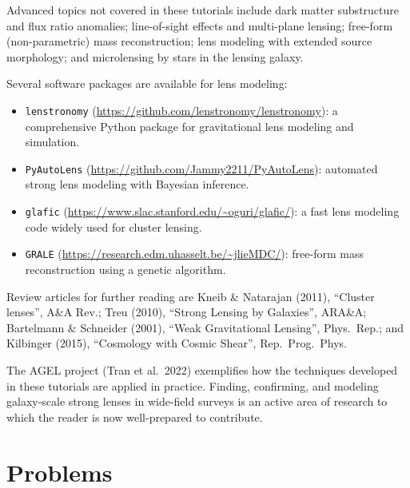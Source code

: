 Advanced topics not covered in these tutorials include dark matter
substructure and flux ratio anomalies; line-of-sight effects and
multi-plane lensing; free-form (non-parametric) mass reconstruction;
lens modeling with extended source morphology; and microlensing by
stars in the lensing galaxy.

Several software packages are available for lens modeling:
\begin{itemize}[nosep]
    \item \texttt{lenstronomy}
          (\url{https://github.com/lenstronomy/lenstronomy}):
          a comprehensive Python package for gravitational
          lens modeling and simulation.
    \item \texttt{PyAutoLens}
          (\url{https://github.com/Jammy2211/PyAutoLens}):
          automated strong lens modeling with Bayesian
          inference.
    \item \texttt{glafic}
          (\url{https://www.slac.stanford.edu/~oguri/glafic/}):
          a fast lens modeling code widely used for cluster
          lensing.
    \item \texttt{GRALE}
          (\url{https://research.edm.uhasselt.be/~jlieMDC/}):
          free-form mass reconstruction using a genetic
          algorithm.
\end{itemize}

Review articles for further reading are
Kneib \& Natarajan (2011), ``Cluster lenses'', A\&A Rev.;
Treu (2010), ``Strong Lensing by Galaxies'', ARA\&A;
Bartelmann \& Schneider (2001), ``Weak Gravitational
Lensing'', Phys.\ Rep.; and
Kilbinger (2015), ``Cosmology with Cosmic Shear'',
Rep.\ Prog.\ Phys.

The AGEL project (Tran et al.\ 2022) exemplifies how the techniques
developed in these tutorials are applied in practice.  Finding,
confirming, and modeling galaxy-scale strong lenses in wide-field
surveys is an active area of research to which the reader is now
well-prepared to contribute.


\section{Problems}
\label{sec:cluster_problems}

